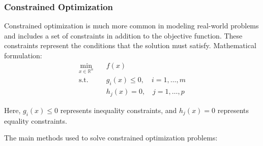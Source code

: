 \subsubsection{Constrained Optimization}
Constrained optimization is much more common in modeling real-world problems and includes a set of constraints in addition to the objective function. These constraints represent the conditions that the solution must satisfy. Mathematical formulation:
\begin{equation}
\begin{aligned}
\min_{x \in \mathbb{R}^n} & \quad f(x) \\
\text{s.t.} & \quad g_i(x) \leq 0, \quad i = 1,\ldots,m \\
& \quad h_j(x) = 0, \quad j = 1,\ldots,p
\end{aligned}
\end{equation}

Here, $g_i(x) \leq 0$ represents inequality constraints, and $h_j(x) = 0$ represents equality constraints.


The main methods used to solve constrained optimization problems:

